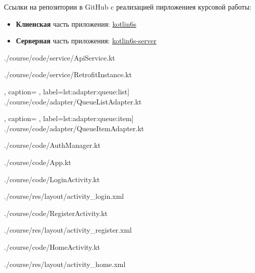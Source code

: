 Ссылки на репозитории в GitHub c реализацией пирложениея курсовой работы:

\begin{itemize}
	\item \textbf{Клиенская} часть приложения:
		\href{https://github.com/AndB0ndar/kotlin6s}{kotlin6s}
	\item \textbf{Серверная} часть приложения:
		\href{https://github.com/AndB0ndar/kotlin6s-server}{kotlin6s-server}
\end{itemize}


\label{lst:retrofit}

{./course/code/service/ApiService.kt}

{./course/code/service/RetrofitInstance.kt}


	, caption=
	, label={lst:adapter:queue:list}]
{./course/code/adapter/QueueListAdapter.kt}

	, caption=
	, label={lst:adapter:queue:item}]
{./course/code/adapter/QueueItemAdapter.kt}

\label{lst:auth:manager}

{./course/code/AuthManager.kt}

\label{lst:app}

{./course/code/App.kt}

\label{lst:activity:login}

{./course/code/LoginActivity.kt}

{./course/res/layout/activity_login.xml}

\label{lst:activity:register}

{./course/code/RegisterActivity.kt}

{./course/res/layout/activity_register.xml}

\label{lst:activity:home}

{./course/code/HomeActivity.kt}

{./course/res/layout/activity_home.xml}

